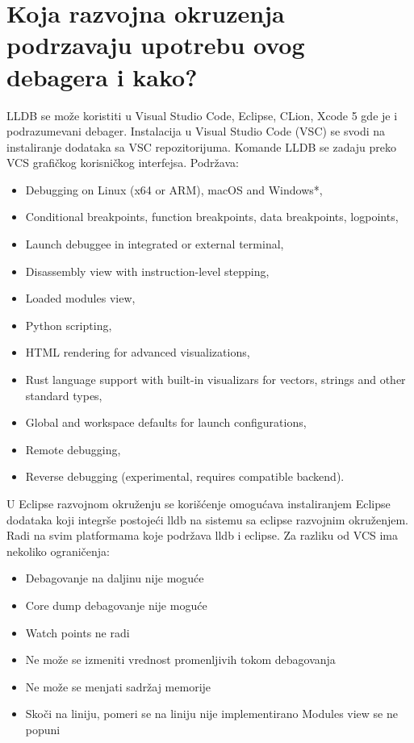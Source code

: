\documentclass[a4paper]{article}
\begin{document}
\section{Koja razvojna okruzenja podrzavaju upotrebu ovog debagera i kako?}
\label{subsec:Koja razvojna okruzenja podrzavaju upotrebu ovog debagera i kako?}

LLDB se može koristiti u Visual Studio Code, Eclipse, CLion, Xcode 5 gde je i podrazumevani debager. 
Instalacija u Visual Studio Code (VSC) se svodi na instaliranje dodataka sa VSC repozitorijuma. Komande LLDB se zadaju preko VCS grafičkog korisničkog interfejsa. 
Podržava:
\begin{itemize}
\item Debugging on Linux (x64 or ARM), macOS and Windows*,
\item Conditional breakpoints, function breakpoints, data breakpoints, logpoints,
\item Launch debuggee in integrated or external terminal,
\item Disassembly view with instruction-level stepping,
\item Loaded modules view,
\item Python scripting,
\item HTML rendering for advanced visualizations,
\item Rust language support with built-in visualizars for vectors, strings and other standard types,
\item Global and workspace defaults for launch configurations,
\item Remote debugging,
\item Reverse debugging (experimental, requires compatible backend).
\end{itemize}

U Eclipse razvojnom okruženju se korišćenje omogućava instaliranjem Eclipse dodataka koji integrše postojeći lldb na sistemu sa eclipse razvojnim okruženjem. Radi na svim platformama koje podržava lldb i eclipse. Za razliku od VCS ima nekoliko ograničenja:

\begin{itemize}
\item Debagovanje na daljinu nije moguće
\item Core dump debagovanje nije moguće
\item Watch points ne radi
\item Ne može se izmeniti vrednost promenljivih tokom debagovanja
\item Ne može se menjati sadržaj memorije
\item Skoči na liniju, pomeri se na liniju nije implementirano
Modules view se ne popuni
\end{itemize}
\end{document}
